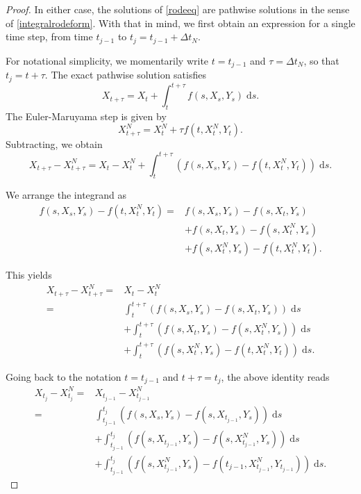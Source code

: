 \documentclass[reqno,12pt]{amsart}
\theoremstyle{plain}%
\theoremstyle{definition}
\begin{document}
\begin{proof}
    In either case, the solutions of \eqref{rodeeq} are pathwise solutions in the sense of \eqref{integralrodeform}. With that in mind, we first obtain an expression for a single time step, from time $t_{j-1}$ to $t_j = t_{j-1} + \Delta t_N$.
    
    For notational simplicity, we momentarily write $t = t_{j-1}$ and $\tau = \Delta t_N$, so that $t_j = t + \tau$. The exact pathwise solution satisfies
    $$
    X_{t + \tau} = X_t + \int_t^{t + \tau} f(s, X_s, Y_s) \;\mathrm{d}s.
    $$
    The Euler-Maruyama step is given by
    $$
    X_{t+\tau}^N = X_t^N + \tau f(t, X_t^N, Y_t).
    $$
    Subtracting, we obtain
    $$
    X_{t + \tau} - X_{t + \tau}^N = X_t - X_t^N + \int_t^{t + \tau} \left( f(s, X_s, Y_s) - f(t, X_t^N, Y_t) \right)\;\mathrm{d}s.
    $$

    We arrange the integrand as
    \begin{align*}
    f(s, X_s, Y_s) - f(t, X_t^N, Y_t) = & f(s, X_s, Y_s) - f(s, X_t, Y_s) \\ 
    & + f(s, X_t, Y_s) - f(s, X_t^N, Y_s) \\
    & + f(s, X_t^N, Y_s) - f(t, X_t^N, Y_t).
    \end{align*}

    This yields
    \begin{align*}
        X_{t + \tau} - X_{t + \tau}^N  = & X_t - X_t^N \\
        = &  \int_t^{t + \tau} \left( f(s, X_s, Y_s) - f(s, X_t, Y_s) \right)\;\mathrm{d}s \\ 
        & + \int_t^{t + \tau} \left( f(s, X_t, Y_s) - f(s, X_t^N, Y_s) \right)\;\mathrm{d}s \\
        & + \int_t^{t + \tau} \left( f(s, X_t^N, Y_s) - f(t, X_t^N, Y_t) \right)\;\mathrm{d}s.
    \end{align*}

    Going back to the notation $t = t_{j-1}$ and $t + \tau = t_j$, the above identity reads
    \begin{equation}
        \label{singlestep}
        \begin{aligned}
            X_{t_j} - X_{t_j}^N  = & X_{t_{j-1}} - X_{t_{j-1}}^N \\
            = &  \int_{t_{j-1}}^{t_j} \left( f(s, X_s, Y_s) - f(s, X_{t_{j-1}}, Y_s) \right)\;\mathrm{d}s \\ 
            & + \int_{t_{j-1}}^{t_j} \left( f(s, X_{t_{j-1}}, Y_s) - f(s, X_{t_{j-1}}^N, Y_s) \right)\;\mathrm{d}s \\
            & + \int_{t_{j-1}}^{t_j} \left( f(s, X_{t_{j-1}}^N, Y_s) - f(t_{j-1}, X_{t_{j-1}}^N, Y_{t_{j-1}}) \right)\;\mathrm{d}s.
        \end{aligned}
    \end{equation}


\end{proof}
\end{document}
